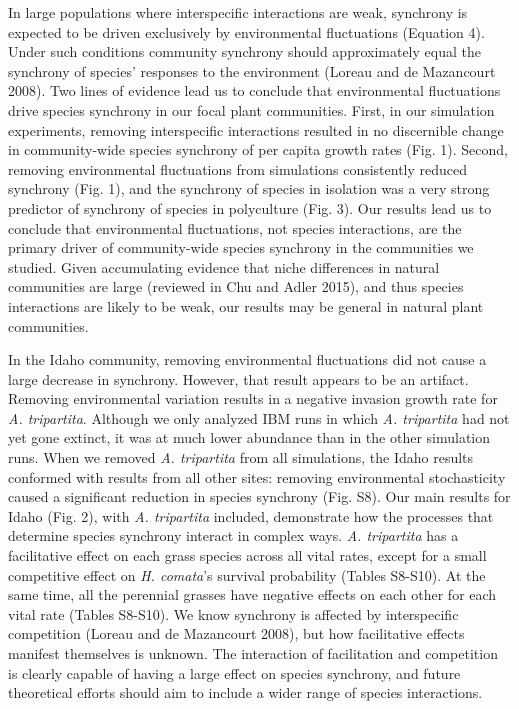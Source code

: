 \documentclass[12pt,]{article}
\begin{document}
In large populations where interspecific interactions are weak,
synchrony is expected to be driven exclusively by environmental
fluctuations (Equation 4). Under such conditions community synchrony
should approximately equal the synchrony of species' responses to the
environment (Loreau and {{de Mazancourt}} 2008). Two lines of evidence
lead us to conclude that environmental fluctuations drive species
synchrony in our focal plant communities. First, in our simulation
experiments, removing interspecific interactions resulted in no
discernible change in community-wide species synchrony of per capita
growth rates (Fig. 1). Second, removing environmental fluctuations from
simulations consistently reduced synchrony (Fig. 1), and the synchrony
of species in isolation was a very strong predictor of synchrony of
species in polyculture (Fig. 3). Our results lead us to conclude that
environmental fluctuations, not species interactions, are the primary
driver of community-wide species synchrony in the communities we
studied. Given accumulating evidence that niche differences in natural
communities are large (reviewed in Chu and Adler 2015), and thus species
interactions are likely to be weak, our results may be general in
natural plant communities.

In the Idaho community, removing environmental fluctuations did not
cause a large decrease in synchrony. However, that result appears to be
an artifact. Removing environmental variation results in a negative
invasion growth rate for \emph{A. tripartita}. Although we only analyzed
IBM runs in which \emph{A. tripartita} had not yet gone extinct, it was
at much lower abundance than in the other simulation runs. When we
removed \emph{A. tripartita} from all simulations, the Idaho results
conformed with results from all other sites: removing environmental
stochasticity caused a significant reduction in species synchrony (Fig.
S8). Our main results for Idaho (Fig. 2), with \emph{A. tripartita}
included, demonstrate how the processes that determine species synchrony
interact in complex ways. \emph{A. tripartita} has a facilitative effect
on each grass species across all vital rates, except for a small
competitive effect on \emph{H. comata}'s survival probability (Tables
S8-S10). At the same time, all the perennial grasses have negative
effects on each other for each vital rate (Tables S8-S10). We know
synchrony is affected by interspecific competition (Loreau and {{de
Mazancourt}} 2008), but how facilitative effects manifest themselves is
unknown. The interaction of facilitation and competition is clearly
capable of having a large effect on species synchrony, and future
theoretical efforts should aim to include a wider range of species
interactions.
\end{document}
